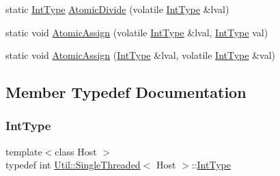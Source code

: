 \begin{DoxyCompactItemize}
\item 
static \mbox{\hyperlink{classUtil_1_1SingleThreaded_a35932213fb0c15a7b67ced79bc2af4c6}{Int\+Type}} \mbox{\hyperlink{classUtil_1_1SingleThreaded_afb0bc74b0e21b32b31c4895fa22a3337}{Atomic\+Divide}} (volatile \mbox{\hyperlink{classUtil_1_1SingleThreaded_a35932213fb0c15a7b67ced79bc2af4c6}{Int\+Type}} \&lval)
\item 
static void \mbox{\hyperlink{classUtil_1_1SingleThreaded_a712bba75b676a88de414ccbd4df775eb}{Atomic\+Assign}} (volatile \mbox{\hyperlink{classUtil_1_1SingleThreaded_a35932213fb0c15a7b67ced79bc2af4c6}{Int\+Type}} \&lval, \mbox{\hyperlink{classUtil_1_1SingleThreaded_a35932213fb0c15a7b67ced79bc2af4c6}{Int\+Type}} val)
\item 
static void \mbox{\hyperlink{classUtil_1_1SingleThreaded_a013f12cfed48924a184b58e9d614dc6a}{Atomic\+Assign}} (\mbox{\hyperlink{classUtil_1_1SingleThreaded_a35932213fb0c15a7b67ced79bc2af4c6}{Int\+Type}} \&lval, volatile \mbox{\hyperlink{classUtil_1_1SingleThreaded_a35932213fb0c15a7b67ced79bc2af4c6}{Int\+Type}} \&val)
\end{DoxyCompactItemize}


\subsection{Member Typedef Documentation}
\mbox{\label{classUtil_1_1SingleThreaded_a35932213fb0c15a7b67ced79bc2af4c6}} 
\subsubsection{\texorpdfstring{IntType}{IntType}\hspace{0.1cm}{\footnotesize\ttfamily [1/2]}}
{\footnotesize\ttfamily template$<$class Host $>$ \\
typedef int \mbox{\hyperlink{classUtil_1_1SingleThreaded}{Util\+::\+Single\+Threaded}}$<$ Host $>$\+::\mbox{\hyperlink{classUtil_1_1SingleThreaded_a35932213fb0c15a7b67ced79bc2af4c6}{Int\+Type}}}

\mbox{\label{classUtil_1_1SingleThreaded_a35932213fb0c15a7b67ced79bc2af4c6}} 
